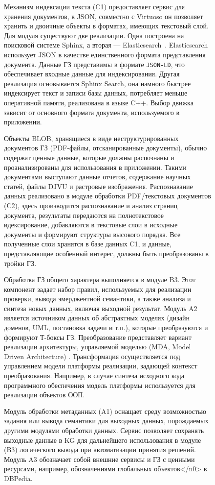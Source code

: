 \documentclass[ 

]{aiitart}
\begin{document}
\begin{figure}
Механизм индексации текста (C1) предоставляет сервис для хранения документов, в JSON, совместно с Virtuoso он позволяет хранить и двоичные объекты в форматах, имеющих текстовый слой. Для модуля существуют две реализации. Одна построена на поисковой системе Sphinx, а вторая — Elasticsearch~\cite{b13}. Elasticsearch использует JSON в качестве единственного формата представления документа.  Данные ГЗ представимы в формате \verb|JSON-LD|, что обеспечивает входные данные для индексирования. Другая реализация основывается Sphinx Search, она намного быстрее индексирует текст и записи базы данных, потребляет меньше оперативной памяти, реализована в языке C++. Выбор движка зависит от основного формата документа, используемого в приложении. 

Объекты BLOB, хранящиеся в виде неструктурированных документов ГЗ (PDF-файлы, отсканированные документы), обычно содержат ценные данные, которые должны распознаны и проанализированы для использования в приложении. Такими документами выступают данные отчетов, содержание научных статей, файлы DJVU и растровые изображения. Распознавание данных реализовано в модуле обработки PDF/текстовых документов (C2), здесь производится распознавание и анализ страниц документа, результаты передаются на полнотекстовое идексирование, добавляются в текстовые слои в исходные документы и формируют структуры высокого порядка. Все полученные слои хранятся в базе данных C1, и данные, представляющие особенный интерес, должны быть преобразованы в тройки ГЗ. 

Обработка ГЗ общего характера выполняется в модуле B3. Этот компонент задает набор правил, используемых для реализации проверки, вывода эмерджентной семантики, а также анализа и синтеза новых данных, включая выходной результат. Модуль A2 является источником данных об абстрактных моделях (дизайн доменов, UML, постановка задачи и т.п.), которые преобразуются и формируют Т-боксы ГЗ. Преобразование представляет вариант реализации архитектуры, управляемой моделью (MDA, Model Driven Architecture) \cite{b2}. Трансформация осуществляется под управлением модели платформы реализации, задающей контекст преобразования. Например, в случае синтеза исходного кода программного обеспечения модель платформы используется для реализации объектов ООП. 

Модуль обработки метаданных (A1) оснащает среду возможностью задания или вывода семантики для выходных данных, порождаемых другими модулями обработки данных. Сервис позволяет сохранять выходные данные в KG для дальнейшего использования в модуле (B3) логического вывода при автоматизации принятия решений. Модуль A3 обозначает собой внешние сервисы и ГЗ с ценными ресурсами, например, обозначениями \cite{b3}глобальных объектов</n0> в DBPedia. 


\end{figure}
\end{document}
